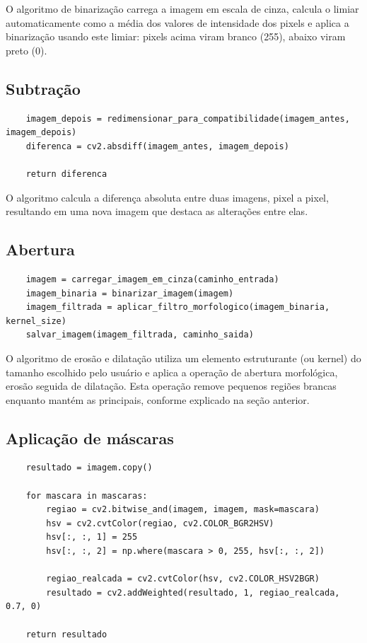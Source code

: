 \documentclass{article}
\begin{document}
O algoritmo de binarização carrega a imagem em escala de cinza, calcula o limiar automaticamente como a média dos valores de intensidade dos pixels e aplica a binarização usando este limiar: pixels acima viram branco (255), abaixo viram preto (0).

\subsection{Subtração}

\begin{verbatim}
    imagem_depois = redimensionar_para_compatibilidade(imagem_antes, imagem_depois)
    diferenca = cv2.absdiff(imagem_antes, imagem_depois)

    return diferenca
\end{verbatim}

O algoritmo calcula a diferença absoluta entre duas imagens, pixel a pixel, resultando em uma nova imagem que destaca as alterações entre elas.

\subsection{Abertura}

\begin{verbatim}
    imagem = carregar_imagem_em_cinza(caminho_entrada)
    imagem_binaria = binarizar_imagem(imagem)
    imagem_filtrada = aplicar_filtro_morfologico(imagem_binaria, kernel_size)
    salvar_imagem(imagem_filtrada, caminho_saida)
\end{verbatim}

O algoritmo de erosão e dilatação utiliza um elemento estruturante (ou kernel) do tamanho escolhido pelo usuário e aplica a operação de abertura morfológica, erosão seguida de dilatação. Esta operação remove pequenos regiões brancas enquanto mantém as principais, conforme explicado na seção anterior.

\subsection{Aplicação de máscaras}

\begin{verbatim}
    resultado = imagem.copy()

    for mascara in mascaras:
        regiao = cv2.bitwise_and(imagem, imagem, mask=mascara)
        hsv = cv2.cvtColor(regiao, cv2.COLOR_BGR2HSV)
        hsv[:, :, 1] = 255
        hsv[:, :, 2] = np.where(mascara > 0, 255, hsv[:, :, 2])

        regiao_realcada = cv2.cvtColor(hsv, cv2.COLOR_HSV2BGR)
        resultado = cv2.addWeighted(resultado, 1, regiao_realcada, 0.7, 0)

    return resultado
\end{verbatim}
\end{document}
